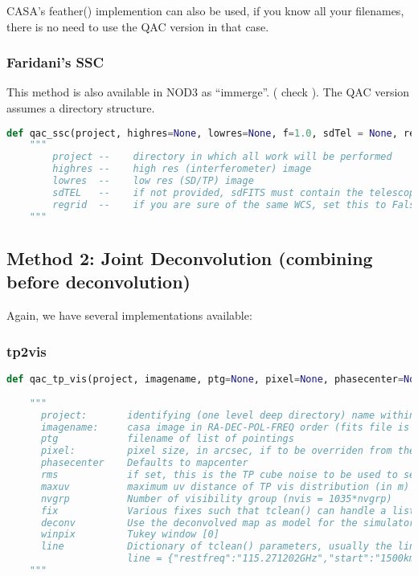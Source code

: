 \documentclass[12pt,a4paper]{article}
\begin{document}
CASA's feather() implemention can also be used, if you know all your filenames, there is no need to use the QAC version
in that case.

\subsubsection{Faridani's SSC}

This method is also available in NOD3 as ``immerge''. ( check ). The QAC version assumes a directory structure.

\begin{lstlisting}[language=Python]
def qac_ssc(project, highres=None, lowres=None, f=1.0, sdTel = None, regrid=True, cleanup=True, label="", niteridx=0, name="dirtymap"):
    """
        project --    directory in which all work will be performed
        highres --    high res (interferometer) image
        lowres  --    low res (SD/TP) image
        sdTEL   --    if not provided, sdFITS must contain the telescope
        regrid  --    if you are sure of the same WCS, set this to False
    """
\end{lstlisting}

\subsection{Method 2: Joint Deconvolution (combining before deconvolution)}

Again, we have several implementations available:

\subsubsection{tp2vis}

\begin{lstlisting}[language=Python]
def qac_tp_vis(project, imagename, ptg=None, pixel=None, phasecenter=None, rms=None, maxuv=10.0, nvgrp=4, fix=1, deconv=True, winpix=0, **line):    
           
    """
      project:       identifying (one level deep directory) name within which all files are places
      imagename:     casa image in RA-DEC-POL-FREQ order (fits file is ok too)
      ptg            filename of list of pointings
      pixel:         pixel size, in arcsec, if to be overriden from the input map. 
      phasecenter    Defaults to mapcenter
      rms            if set, this is the TP cube noise to be used to set the weights
      maxuv          maximum uv distance of TP vis distribution (in m)  [10m] 
      nvgrp          Number of visibility group (nvis = 1035*nvgrp)
      fix            Various fixes such that tclean() can handle a list of ms [fix=1]
      deconv         Use the deconvolved map as model for the simulator.
      winpix         Tukey window [0]
      line           Dictionary of tclean() parameters, usually the line parameters are useful, e.g.
                     line = {"restfreq":"115.271202GHz","start":"1500km/s", "width":"5km/s","nchan":5}
    """
\end{lstlisting}
\end{document}
